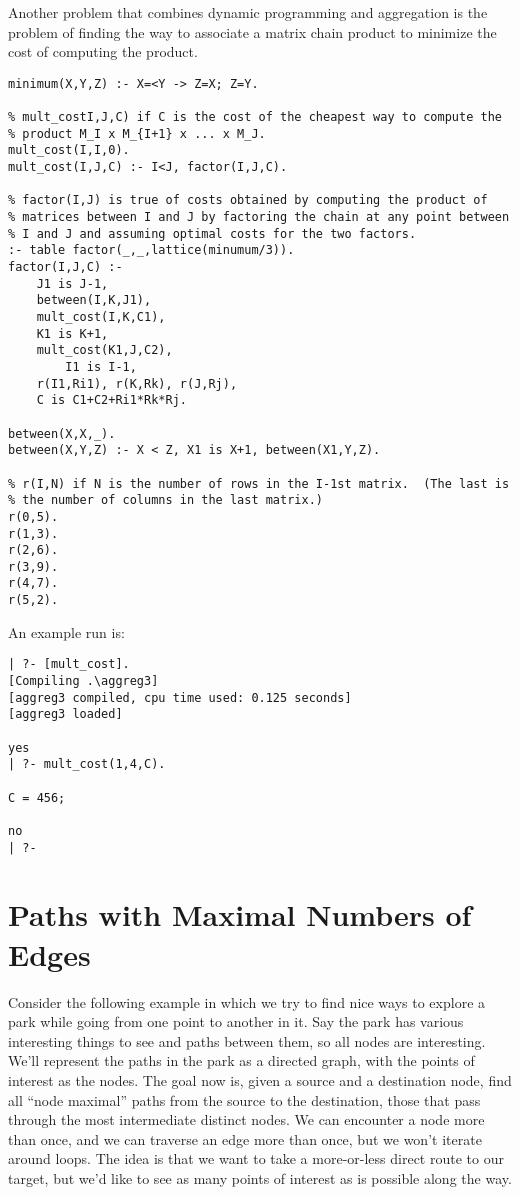 Another problem that combines dynamic programming and aggregation is
the problem of finding the way to associate a matrix chain product to
minimize the cost of computing the product.
\begin{verbatim}
minimum(X,Y,Z) :- X=<Y -> Z=X; Z=Y.

% mult_costI,J,C) if C is the cost of the cheapest way to compute the
% product M_I x M_{I+1} x ... x M_J.
mult_cost(I,I,0).
mult_cost(I,J,C) :- I<J, factor(I,J,C).

% factor(I,J) is true of costs obtained by computing the product of
% matrices between I and J by factoring the chain at any point between
% I and J and assuming optimal costs for the two factors.
:- table factor(_,_,lattice(minumum/3)).
factor(I,J,C) :- 
	J1 is J-1,
	between(I,K,J1),
	mult_cost(I,K,C1),
	K1 is K+1,
	mult_cost(K1,J,C2),
        I1 is I-1,
	r(I1,Ri1), r(K,Rk), r(J,Rj),
	C is C1+C2+Ri1*Rk*Rj.

between(X,X,_).
between(X,Y,Z) :- X < Z, X1 is X+1, between(X1,Y,Z).

% r(I,N) if N is the number of rows in the I-1st matrix.  (The last is
% the number of columns in the last matrix.)
r(0,5).
r(1,3).
r(2,6).
r(3,9).
r(4,7).
r(5,2).
\end{verbatim}

An example run is:
\begin{verbatim}
| ?- [mult_cost].
[Compiling .\aggreg3]
[aggreg3 compiled, cpu time used: 0.125 seconds]
[aggreg3 loaded]

yes
| ?- mult_cost(1,4,C).

C = 456;

no
| ?- 
\end{verbatim}

\section{Paths with Maximal Numbers of Edges}

Consider the following example in which we try to find nice ways to
explore a park while going from one point to another in it.  Say the
park has various interesting things to see and paths between them, so
all nodes are interesting.  We'll represent the paths in the park as a
directed graph, with the points of interest as the nodes.  The goal
now is, given a source and a destination node, find all ``node
maximal'' paths from the source to the destination, those that pass
through the most intermediate distinct nodes.  We can encounter a node
more than once, and we can traverse an edge more than once, but we
won't iterate around loops.  The idea is that we want to take a
more-or-less direct route to our target, but we'd like to see as many
points of interest as is possible along the way.

